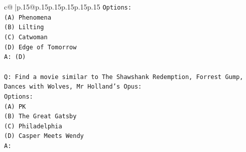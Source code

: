 \documentclass{article}
\begin{document}
{\begin{supertabular}{c@{$\;$}|p{.15\linewidth}@{}p{.15\linewidth}p{.15\linewidth}p{.15\linewidth}p{.15\linewidth}p{.15\linewidth}}
{{{\texttt{Options:} \\
\texttt{(A) Phenomena} \\
\texttt{(B) Lilting} \\
\texttt{(C) Catwoman} \\
\texttt{(D) Edge of Tomorrow} \\
\texttt{A: (D)} \\
\\ 
\texttt{Q: Find a movie similar to The Shawshank Redemption, Forrest Gump, Dances with Wolves, Mr Holland's Opus:} \\
\texttt{Options:} \\
\texttt{(A) PK} \\
\texttt{(B) The Great Gatsby} \\
\texttt{(C) Philadelphia} \\
\texttt{(D) Casper Meets Wendy} \\
\texttt{A:} \\
            }
        }
    }
     \\ \\


\end{supertabular}}
\end{document}
